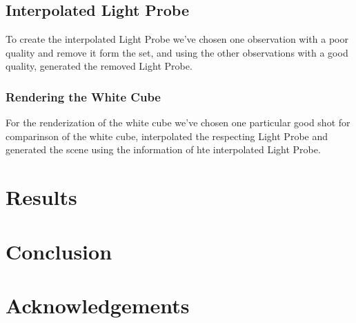 \documentclass[conference]{acmsiggraph}
\begin{document}
\subsection{Interpolated Light Probe}
	To create the interpolated Light Probe we've chosen one observation with a poor quality and remove it form the set, and using the other 
observations with a good quality, generated the removed Light Probe.

\subsubsection{Rendering the White Cube}
	For the renderization of the white cube we've chosen one particular good shot for comparinson of the white cube, interpolated the
respecting Light Probe and generated the scene using the information of hte interpolated Light Probe.

\section{Results}

\section{Conclusion}

\section*{Acknowledgements}



\end{document}
